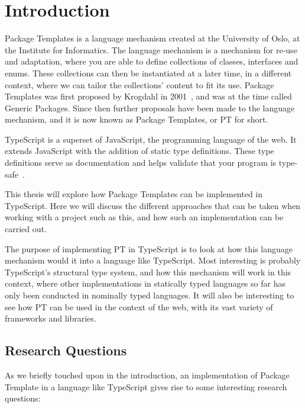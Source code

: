 
\chapter{Introduction}\label{ch:introduction}


Package Templates is a language mechanism created at the University of Oslo, at the Institute for Informatics.
The language mechanism is a mechanism for re-use and adaptation, where you are able to define collections of classes, interfaces and enums.
These collections can then be instantiated at a later time, in a different context, where we can tailor the collections' content to fit its use.
Package Templates was first proposed by Krogdahl in 2001~\cite{krogdahl:GP}, and was at the time called Generic Packages.
Since then further proposals have been made to the language mechanism, and it is now known as Package Templates, or PT for short.

TypeScript is a superset of JavaScript, the programming language of the web.
It extends JavaScript with the addition of static type definitions.
These type definitions serve as documentation and helps validate that your program is type-safe~\cite{tswebsite}.

This thesis will explore how Package Templates can be implemented in TypeScript.
Here we will discuss the different approaches that can be taken when working with a project such as this, and how such an implementation can be carried out.

The purpose of implementing PT in TypeScript is to look at how this language mechanism would it into a language like TypeScript.
Most interesting is probably TypeScript's structural type system, and how this mechanism will work in this context, where other implementations in statically typed languages so far has only been conducted in nominally typed languages.
It will also be interesting to see how PT can be used in the context of the web, with its vast variety of frameworks and libraries.

\section{Research Questions}\label{sec:research-questions}

As we briefly touched upon in the introduction, an implementation of Package Template in a language like TypeScript gives rise to some interesting research questions:

